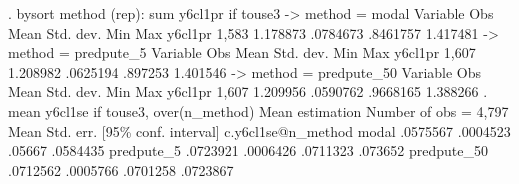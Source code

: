 . bysort method (rep): sum y6cl1pr if touse3
{\smallskip}
-> method = modal
{\smallskip}
    Variable {\VBAR}        Obs        Mean    Std. dev.       Min        Max
     y6cl1pr {\VBAR}      1,583    1.178873    .0784673   .8461757   1.417481
{\smallskip}
-> method = predpute_5
{\smallskip}
    Variable {\VBAR}        Obs        Mean    Std. dev.       Min        Max
     y6cl1pr {\VBAR}      1,607    1.208982    .0625194    .897253   1.401546
{\smallskip}
-> method = predpute_50
{\smallskip}
    Variable {\VBAR}        Obs        Mean    Std. dev.       Min        Max
     y6cl1pr {\VBAR}      1,607    1.209956    .0590762   .9668165   1.388266
{\smallskip}
{\smallskip}
. mean y6cl1se if touse3, over(n_method)
{\smallskip}
Mean estimation                                Number of obs = 4,797
{\smallskip}
                   {\VBAR}       Mean   Std. err.     [95\% conf. interval]
c.y6cl1se@n_method {\VBAR}
            modal  {\VBAR}   .0575567   .0004523        .05667    .0584435
       predpute_5  {\VBAR}   .0723921   .0006426      .0711323     .073652
      predpute_50  {\VBAR}   .0712562   .0005766      .0701258    .0723867
